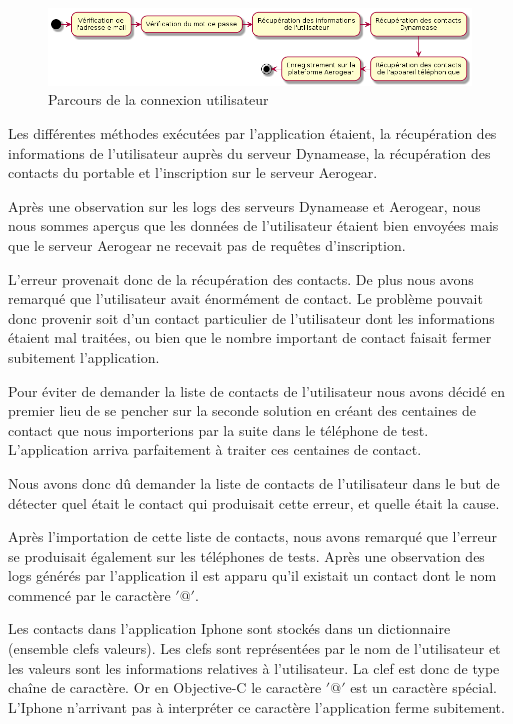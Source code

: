 \begin{figure}[!h]
	\centering
	\includegraphics[scale=0.5]{img/activity_ios.png}
	\caption{\label{activity_ios} {Parcours de la connexion utilisateur}}
\end{figure}

Les différentes méthodes exécutées par l'application étaient, la récupération des informations de l'utilisateur auprès du serveur Dynamease, la récupération des contacts du portable et l'inscription sur le serveur Aerogear.

Après une observation sur les logs des serveurs Dynamease et Aerogear, nous nous sommes aperçus que les données de l'utilisateur étaient bien envoyées mais que le serveur Aerogear ne recevait pas de requêtes d'inscription.

L'erreur provenait donc de la récupération des contacts. De plus nous avons remarqué que l'utilisateur avait énormément de contact. Le problème pouvait donc provenir soit d'un contact particulier de l'utilisateur dont les informations étaient mal traitées, ou bien que le nombre important de contact faisait fermer subitement l'application.

Pour éviter de demander la liste de contacts de l'utilisateur nous avons décidé en premier lieu de se pencher sur la seconde solution en créant des centaines de contact que nous importerions par la suite dans le téléphone de test. L'application arriva parfaitement à traiter ces centaines de contact.

Nous avons donc dû demander la liste de contacts de l'utilisateur dans le but de détecter quel était le contact qui produisait cette erreur, et quelle était la cause.

Après l'importation de cette liste de contacts, nous avons remarqué que l'erreur se produisait également sur les téléphones de tests. Après une observation des logs générés par l'application il est apparu qu'il existait un contact dont le nom commencé par le caractère $'@'$.

Les contacts dans l'application Iphone sont stockés dans un dictionnaire (ensemble clefs valeurs). Les clefs sont représentées par le nom de l'utilisateur et les valeurs sont les informations relatives à l'utilisateur. La clef est donc de type chaîne de caractère. Or en Objective-C le caractère $'@'$ est un caractère spécial. L'Iphone n'arrivant pas à interpréter ce caractère l'application ferme subitement.

